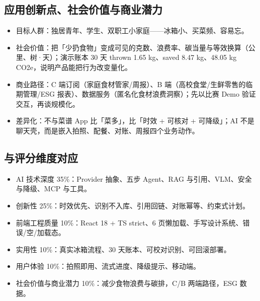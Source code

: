 \subsection{应用创新点、社会价值与商业潜力}

\begin{itemize}
\item 目标人群：独居青年、学生、双职工小家庭——冰箱小、买菜频、容易忘。
\item 社会价值：把「少扔食物」变成可见的克数、浪费率、碳当量与等效换算（公里、树·天）；演示账本 30 天 thrown 1.65 kg、saved 8.47 kg、48.05 kg CO2e，说明产品能把行为改变量化。
\item 商业路径：C 端订阅（家庭食材管家/周报）、B 端（高校食堂/生鲜零售的临期管理/ESG 报表）、数据服务（匿名化食材浪费洞察）；先以比赛 Demo 验证交互，再谈规模化。
\item 差异化：不与菜谱 App 比「菜多」，比「时效 + 可核对 + 可降级」；AI 不是聊天壳，而是嵌入拍照、配餐、对账、周报四个业务动作。
\end{itemize}

\subsection{与评分维度对应}

\begin{itemize}
\item AI 技术深度 35\%：Provider 抽象、五步 Agent、RAG 与引用、VLM、安全与降级、MCP 与工具。
\item 创新性 25\%：时效优先、识别不入库、引用回链、对账幂等、约束式计划。
\item 前端工程质量 10\%：React 18 + TS strict、6 页懒加载、手写设计系统、错误/空/加载态。
\item 实用性 10\%：真实冰箱流程、30 天账本、可校对识别、可回滚部署。
\item 用户体验 10\%：拍照即用、流式进度、降级提示、移动端。
\item 社会价值与商业潜力 10\%：减少食物浪费与碳排，C/B 两端路径，ESG 数据。
\end{itemize}




